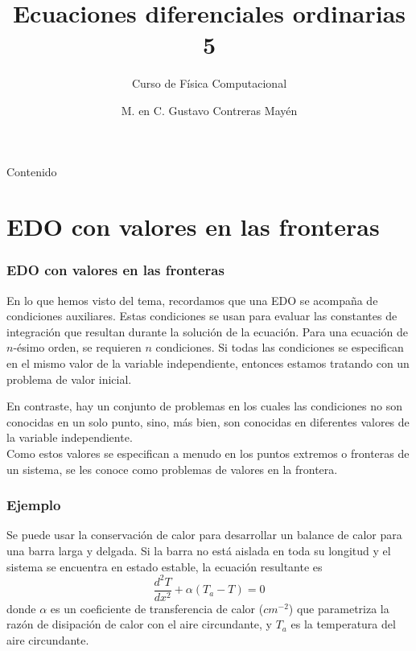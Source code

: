 

\usepackage{siunitx}
\usepackage[american,cuteinductors,smartlabels]{circuitikz}
\usetikzlibrary{calc}
\title{Ecuaciones diferenciales ordinarias 5}
\subtitle{Curso de F\'{i}sica Computacional}
\author{M. en C. Gustavo Contreras May\'{e}n}

\maketitle
\fontsize{14}{14}\selectfont
{}
\begin{frame}{Contenido}
\tableofcontents[pausesections]
\end{frame}
\section{EDO con valores en las fronteras}
\begin{frame}
\frametitle{EDO con valores en las fronteras}
En lo que hemos visto del tema, recordamos que una EDO se acompaña de condiciones auxiliares. Estas condiciones se usan para evaluar las constantes de integraci\'{o}n que resultan durante la soluci\'{o}n de la ecuaci\'{o}n. Para una ecuaci\'{o}n de $n$-\'{e}simo orden, se requieren $n$ condiciones. Si todas las condiciones se especifican en el mismo valor de la variable independiente, entonces estamos tratando con un problema de valor inicial.
\end{frame}
\begin{frame}
En contraste, hay un conjunto de problemas en los cuales las condiciones no son conocidas en un solo punto, sino, m\'{a}s bien, son conocidas en diferentes valores de la variable independiente.
\\
\bigskip
Como estos valores se especifican a menudo en los puntos extremos o fronteras de un sistema, se les conoce como problemas de valores en la frontera.
\end{frame}
\begin{frame}
\frametitle{Ejemplo}
Se puede usar la conservaci\'{o}n de calor para desarrollar un balance de calor para una barra larga y delgada. Si la barra no est\'{a} aislada en toda su longitud y el sistema se encuentra en estado estable, la ecuación resultante es
\begin{equation} \label{eq:ec_calor1}
 \dfrac{d^{2}T}{dx^{2}} + \alpha(T_{a} - T) = 0 
\end{equation}
donde $\alpha$ es un coeficiente de transferencia de calor ($cm^{-2}$) que parametriza la raz\'{o}n de disipaci\'{o}n de calor con el aire circundante, y $T_{a}$ es la temperatura del aire circundante.
\end{frame}
